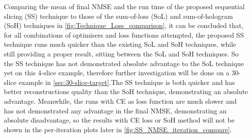 Comparing the mean of final NMSE and the run time of the proposed sequential slicing (SS) technique to those of the sum-of-loss (SoL) and sum-of-hologram (SoH) techniques in \cref{fig:Technique_Loss_comparison}, it can be concluded that, for all combinations of optimisers and loss functions attempted, the proposed SS technique runs much quicker than the existing SoL and SoH techniques, while still providing a proper result, sitting between the SoL and SoH techniques. So the SS technique has not demonstrated absolute advantage to the SoL technique yet on this 4-slice example, therefore further investigation will be done on a 30-slice example in \cref{sec:30-slice-target}.The SS technique is both quicker and has better reconstructions quality than the SoH technique, demonstrating an absolute advantage. Meanwhile, the runs with CE as loss function are much slower and has not demonstrated any advantage in the final NMSE, demonstrating an absolute disadvantage, so the results with CE loss or SoH method will not be shown in the per-iteration plots later in \cref{fig:SS_NMSE_iteration_compare}.

